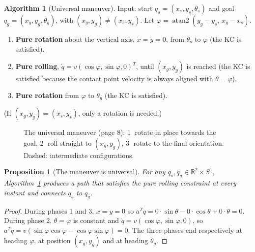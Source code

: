 \documentclass[11pt,a4paper]{article}
\theoremstyle{definition}
\newtheorem{algorithm}[definition]{Algorithm}
\theoremstyle{plain}
\newtheorem{proposition}[definition]{Proposition}
\newcommand{\fixedwheel}[2]{\begin{scope}[shift={(#1)},rotate=#2]
  \draw[fill=gray!30] (-0.3,-0.07) rectangle (0.3,0.07);\end{scope}}
\newcommand{\ghostwheel}[2]{\begin{scope}[shift={(#1)},rotate=#2]
  \draw[dashed,gray] (-0.3,-0.07) rectangle (0.3,0.07);\end{scope}}
\begin{document}
\begin{algorithm}[Universal maneuver]\label{alg:universal}
Input: start $q_s=(x_s,y_s,\theta_s)$ and goal $q_g=(x_g,y_g,\theta_g)$, with $(x_g,y_g)\neq(x_s,y_s)$. Let $\varphi=\operatorname{atan2}(y_g-y_s,\,x_g-x_s)$.
\begin{enumerate}[nosep]
  \item \textbf{Pure rotation} about the vertical axis, $\dot x=\dot y=0$, from $\theta_s$ to $\varphi$ (the KC is satisfied).
  \item \textbf{Pure rolling}, $\dot q=v(\cos\varphi,\sin\varphi,0)^{T}$, until $(x_g,y_g)$ is reached (the KC is satisfied because the contact point velocity is always aligned with $\theta=\varphi$).
  \item \textbf{Pure rotation} from $\varphi$ to $\theta_g$ (the KC is satisfied).
\end{enumerate}
(If $(x_g,y_g)=(x_s,y_s)$, only a rotation is needed.)
\end{algorithm}
 
\begin{figure}[H]
\centering
{}
\caption{The universal maneuver (page 8): \textcircled{1} rotate in place towards the goal, \textcircled{2} roll straight to $(x_g,y_g)$, \textcircled{3} rotate to the final orientation. Dashed: intermediate configurations.}
\end{figure}
 
\begin{proposition}[The maneuver is universal]\label{alg:universal}
For any $q_s,q_g\in\mathbb R^2\times S^1$, Algorithm~\ref{alg:universal} produces a path that satisfies the pure rolling constraint at every instant and connects $q_s$ to $q_g$.
\end{proposition}
\begin{proof}
During phases 1 and 3, $\dot x=\dot y=0$ so $a^{T}\dot q=0\cdot\sin\theta-0\cdot\cos\theta+0\cdot\dot\theta=0$. During phase 2, $\theta=\varphi$ is constant and $\dot q=v(\cos\varphi,\sin\varphi,0)$, so $a^{T}\dot q=v(\sin\varphi\cos\varphi-\cos\varphi\sin\varphi)=0$. The three phases end respectively at heading $\varphi$, at position $(x_g,y_g)$ and at heading $\theta_g$.
\end{proof}
 
\end{document}
